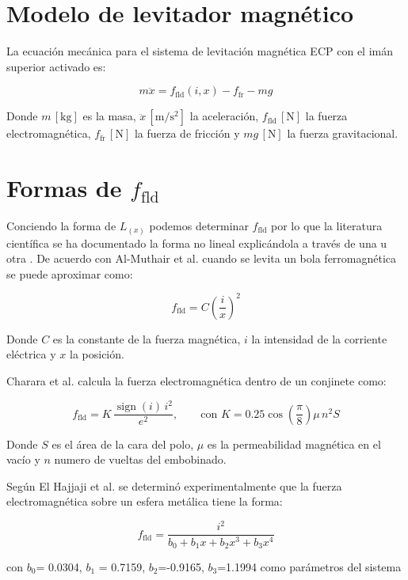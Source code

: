 \section{Modelo de levitador magnético}

La ecuación mecánica para el sistema de levitación magnética ECP \cite{730} con el imán superior activado es:

\begin{equation}
m\ddot{x} = f_{\text{fld}}(i,x) - f_{\text{fr}} - mg
\label{eq:mec}
\end{equation}

Donde \( m \,[\text{kg}] \) es la masa, \( \ddot{x} \,[\text{m}/\text{s}^2] \) la aceleración,
 \( f_{\text{fld}} \,[\text{N}] \) la fuerza electromagnética, \( f_{\text{fr}} \,[\text{N}] \) la fuerza de fricción y \( mg \,[\text{N}] \) la fuerza gravitacional.

\section{\texorpdfstring{Formas de $f_{\text{fld}}$}{Formas de fld}}

Conciendo la forma de $L_{(x)}$ podemos determinar $f_{\text{fld}}$ por lo que la literatura científica se ha documentado la forma no lineal explicándola a través de una u otra . De acuerdo con Al-Muthair et al. \cite{al} cuando se levita un bola ferromagnética se puede aproximar como:

\[
f_{\text{fld}} = C\left(\dfrac{i}{x}\right)^2
\]

Donde $C$ es la constante de la fuerza magnética, $i$ la intensidad de la corriente eléctrica y $x$ la posición.

Charara et al. \cite{charara} calcula la fuerza electromagnética dentro de un conjinete como:

\[ 
f_{\text{fld}} = K\,\frac{\operatorname{sign}(i)\,i^{2}}{e^{2}}, 
\qquad \text{con } 
K = 0.25 \cos\!\left(\frac{\pi}{8}\right)\!\mu\, n^{2} S 
\]

Donde $S$ es el área de la cara del polo, $\mu$ es la permeabilidad magnética en el vacío y $n$ numero de vueltas del embobinado.

Según El Hajjaji et al. \cite{el} se determinó experimentalmente que la fuerza electromagnética sobre un esfera metálica tiene la forma:


\[ 
f_{\text{fld}} = \dfrac{i^{2}}{b_0 + b_1x + b_2x^3 + b_3x^4}
\]

con $b_0$= 0.0304, $b_1$ = 0.7159, $b_2$=-0.9165, $b_3$=1.1994 como parámetros del sistema


